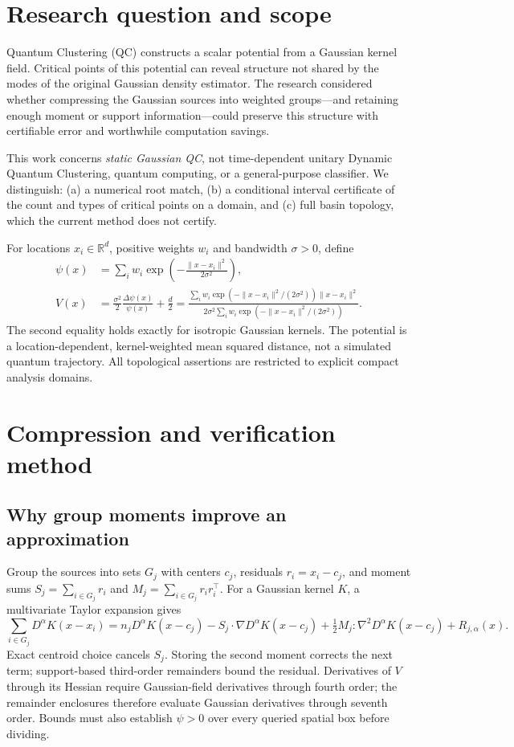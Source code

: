 \documentclass[10pt,a4paper]{article}
\begin{document}
\section{Research question and scope}
Quantum Clustering (QC) constructs a scalar potential from a Gaussian kernel field. Critical points of this potential can reveal structure not shared by the modes of the original Gaussian density estimator. The research considered whether compressing the Gaussian sources into weighted groups---and retaining enough moment or support information---could preserve this structure with certifiable error and worthwhile computation savings.

This work concerns \emph{static Gaussian QC}, not time-dependent unitary Dynamic Quantum Clustering, quantum computing, or a general-purpose classifier. We distinguish: (a) a numerical root match, (b) a conditional interval certificate of the count and types of critical points on a domain, and (c) full basin topology, which the current method does not certify.

For locations $x_i\in\mathbb R^d$, positive weights $w_i$ and bandwidth $\sigma>0$, define
\begin{align}
\psi(x)&=\sum_iw_i\exp\!\left(-\frac{\|x-x_i\|^2}{2\sigma^2}\right),\\
V(x)&=\frac{\sigma^2}{2}\frac{\Delta\psi(x)}{\psi(x)}+\frac d2
=\frac{\sum_iw_i\exp(-\|x-x_i\|^2/(2\sigma^2))\|x-x_i\|^2}{2\sigma^2\sum_iw_i\exp(-\|x-x_i\|^2/(2\sigma^2))}.\label{eq:potential}
\end{align}
The second equality holds exactly for isotropic Gaussian kernels. The potential is a location-dependent, kernel-weighted mean squared distance, not a simulated quantum trajectory. All topological assertions are restricted to explicit compact analysis domains.

\section{Compression and verification method}
\subsection{Why group moments improve an approximation}
Group the sources into sets $G_j$ with centers $c_j$, residuals $r_i=x_i-c_j$, and moment sums $S_j=\sum_{i\in G_j}r_i$ and $M_j=\sum_{i\in G_j}r_ir_i^\top$. For a Gaussian kernel $K$, a multivariate Taylor expansion gives
\begin{equation}
\sum_{i\in G_j} D^\alpha K(x-x_i)
=n_jD^\alpha K(x-c_j)-S_j\!\cdot\!\nabla D^\alpha K(x-c_j)
+\tfrac12M_j\!:\!\nabla^2D^\alpha K(x-c_j)+R_{j,\alpha}(x).\label{eq:taylor}
\end{equation}
Exact centroid choice cancels $S_j$. Storing the second moment corrects the next term; support-based third-order remainders bound the residual. Derivatives of $V$ through its Hessian require Gaussian-field derivatives through fourth order; the remainder enclosures therefore evaluate Gaussian derivatives through seventh order. Bounds must also establish $\psi>0$ over every queried spatial box before dividing.
\end{document}
